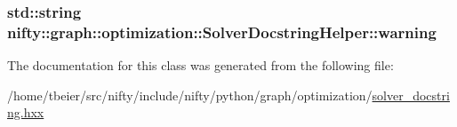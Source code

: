 \subsubsection[{warning}]{\setlength{\rightskip}{0pt plus 5cm}std\+::string nifty\+::graph\+::optimization\+::\+Solver\+Docstring\+Helper\+::warning}\label{classnifty_1_1graph_1_1optimization_1_1SolverDocstringHelper_a7bfc4ddf7f8bb43184293bfe5cf04895}


The documentation for this class was generated from the following file\+:\begin{DoxyCompactItemize}
\item 
/home/tbeier/src/nifty/include/nifty/python/graph/optimization/\hyperlink{solver__docstring_8hxx}{solver\+\_\+docstring.\+hxx}\end{DoxyCompactItemize}
